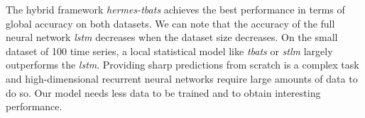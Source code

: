 \documentclass[review]{elsarticle}
\begin{document}
The hybrid framework \textit{hermes-tbats} achieves the best performance in terms of global accuracy on both datasets. 
We can note that the accuracy of the full neural network \textit{lstm} decreases when the dataset size decreases. On the small dataset of 100 time series, a local statistical model like \textit{tbats} or \textit{stlm} largely outperforms the \textit{lstm}. Providing sharp predictions from scratch is a complex task and high-dimensional recurrent neural networks require  large amounts of data to do so. 
Our model needs less data to be trained and to obtain interesting performance.


\begin{table}
  \caption{Results summary on the 1000 time series and 100 time series Fashion dataset. The MASE average on all the time series is computed. For the two approaches using a neural network, 10 models with different seeds are trained. the mean and the standard deviation of the 10 results are displayed.}
 \centering
\end{table}
\end{document}
